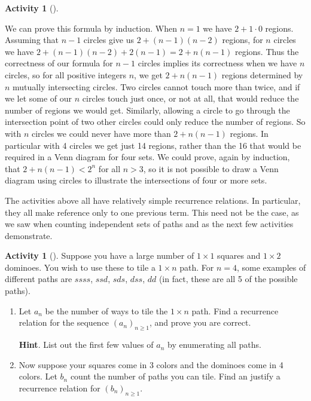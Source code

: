\documentclass[10pt,]{book}
\theoremstyle{plain}
\theoremstyle{definition}
\theoremstyle{definition}
\theoremstyle{definition}
\newtheorem{activity}[project]{Activity}
\theoremstyle{definition}
\numberwithin{equation}{chapter}
\newcommand{\lt}{<}
\begin{document}
\begin{activity}[]
\begin{equation*}
\end{equation*}
%
\par
\hypertarget{p-811}{}%
We can prove this formula by induction. When \(n=1\) we have \(2+1\cdot0\) regions. Assuming that \(n-1\) circles give us \(2+(n-1)(n-2)\) regions, for \(n\) circles we have \(2+(n-1)(n-2) +2(n-1)=2+n(n-1)\) regions. Thus the correctness of our formula for \(n-1\) circles implies its correctness when we have \(n\) circles, so for all positive integers \(n\), we get \(2+n(n-1)\) regions determined by \(n\) mutually intersecting circles. Two circles cannot touch more than twice, and if we let some of our \(n\) circles touch just once, or not at all, that would reduce the number of regions we would get. Similarly, allowing a circle to go through the intersection point of two other circles could only reduce the number of regions. So with \(n\) circles we could never have more than \(2+n(n-1)\) regions. In particular with 4 circles we get just 14 regions, rather than the 16 that would be required in a Venn diagram for four sets. We could prove, again by induction, that \(2+n(n-1)\lt 2^n\) for all \(n>3\), so it is not possible to draw a Venn diagram using circles to illustrate the intersections of four or more sets.%
\end{activity}
\hypertarget{p-812}{}%
The activities above all have relatively simple recurrence relations.  In particular, they all make reference only to one previous term.  This need not be the case, as we saw when counting independent sets of paths and as the next few activities demonstrate.%
\begin{activity}[]\label{act-dominoes}
\hypertarget{p-813}{}%
Suppose you have a large number of \(1\times 1\) squares and \(1 \times 2\) dominoes.  You wish to use these to tile a \(1 \times n\) path.  For \(n = 4\), some examples of different paths are \(ssss\), \(ssd\), \(sds\), \(dss\), \(dd\) (in fact, these are all 5 of the possible paths).%
\begin{enumerate}[font=\bfseries,label=(\alph*),ref=\alph*]
\item\label{task-102} \hypertarget{p-814}{}%
Let \(a_n\) be the number of ways to tile the \(1 \times n\) path.  Find a recurrence relation for the sequence \((a_n)_{n \ge 1}\), and prove you are correct.%
\par\smallskip%
\noindent\textbf{Hint}.\hypertarget{hint-75}{}\quad%
\hypertarget{p-815}{}%
List out the first few values of \(a_n\) by enumerating all paths.%
\item\label{task-103} \hypertarget{p-816}{}%
Now suppose your squares come in 3 colors and the dominoes come in 4 colors.  Let \(b_n\) count the number of paths you can tile.  Find an justify a recurrence relation for \((b_n)_{n \ge 1}\).%
\end{enumerate}
\end{activity}
\end{document}
